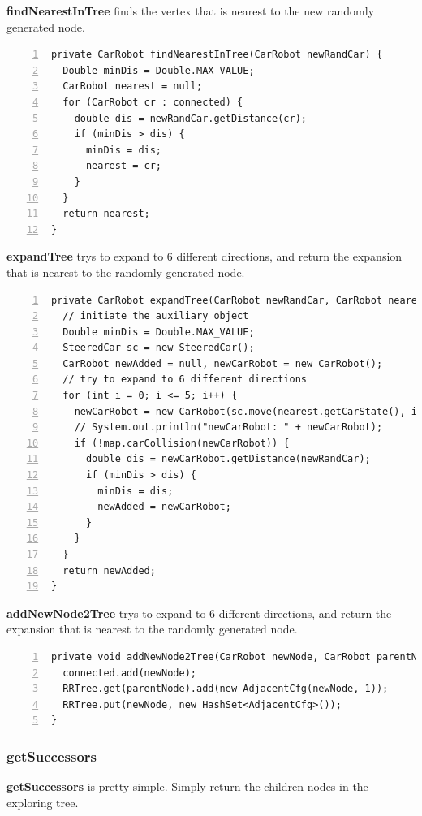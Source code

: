 \documentclass{article}
\begin{document}
\textbf{findNearestInTree} finds the vertex that is nearest to the new randomly generated node.

\begin{lstlisting}[numbers=left]
private CarRobot findNearestInTree(CarRobot newRandCar) {
  Double minDis = Double.MAX_VALUE;
  CarRobot nearest = null;
  for (CarRobot cr : connected) {
    double dis = newRandCar.getDistance(cr);
    if (minDis > dis) {
      minDis = dis;
      nearest = cr;
    }
  }
  return nearest;
}
\end{lstlisting}

\textbf{expandTree} trys to expand to 6 different directions, and return the expansion that is nearest to the randomly generated node.

\begin{lstlisting}[numbers=left]
private CarRobot expandTree(CarRobot newRandCar, CarRobot nearest) {
  // initiate the auxiliary object
  Double minDis = Double.MAX_VALUE;
  SteeredCar sc = new SteeredCar();
  CarRobot newAdded = null, newCarRobot = new CarRobot();
  // try to expand to 6 different directions
  for (int i = 0; i <= 5; i++) {
    newCarRobot = new CarRobot(sc.move(nearest.getCarState(), i, 1.));
    // System.out.println("newCarRobot: " + newCarRobot);
    if (!map.carCollision(newCarRobot)) {
      double dis = newCarRobot.getDistance(newRandCar);
      if (minDis > dis) {
        minDis = dis;
        newAdded = newCarRobot;
      }
    }
  }
  return newAdded;
}

\end{lstlisting}

\textbf{addNewNode2Tree} trys to expand to 6 different directions, and return the expansion that is nearest to the randomly generated node.

\begin{lstlisting}[numbers=left]
private void addNewNode2Tree(CarRobot newNode, CarRobot parentNode) {
  connected.add(newNode);
  RRTree.get(parentNode).add(new AdjacentCfg(newNode, 1));
  RRTree.put(newNode, new HashSet<AdjacentCfg>());
}
\end{lstlisting}





\subsubsection{getSuccessors}

\textbf{getSuccessors} is pretty simple. Simply return the children nodes in the exploring tree.
\end{document}
